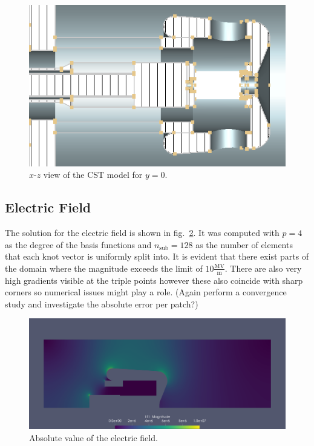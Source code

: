 \begin{center}
\begin{figure}[H]
  \includegraphics[width=\textwidth]{figures/200kV/v1_cuty}
  \caption{$x$-$z$ view of the CST model for $y=0$.}
  \label{fig:cst_geometry_xz}
\end{figure}
\end{center}

\subsection{Electric Field}
The solution for the electric field is shown in fig.~\ref{fig:200kV_electric_field}.
It was computed with $p=4$ as the degree of the basis functions and $n_\mathrm{sub}=128$ as the number of elements that each knot vector is uniformly split into.
It is evident that there exist parts of the domain where the magnitude exceeds the limit of $10 \frac{\mathrm{MV}}{\mathrm{m}}$. There are also very high gradients visible at the triple points however these also coincide with sharp corners so numerical issues might play a role. (Again perform a convergence study and investigate the absolute error per patch?)

\begin{center}
\begin{figure}[H]
  \includegraphics[width=\textwidth]{figures/200kV/gradient_degree=4_nsub=128}
  \caption{Absolute value of the electric field.}
  \label{fig:200kV_electric_field}
\end{figure}
\end{center}

